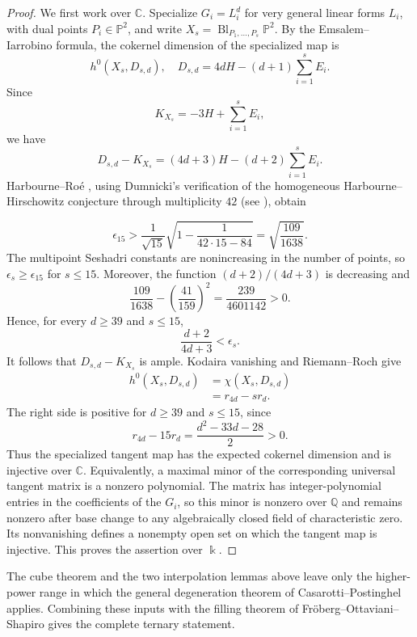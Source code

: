 \documentclass[11pt]{amsart}
\theoremstyle{remark}
\newcommand{\PP}{\mathbb P}
\newcommand{\kk}{\Bbbk}
\begin{document}
\begin{proof}
We first work over $\mathbb C$. Specialize $G_i=L_i^d$ for very general linear forms $L_i$, with dual points $P_i\in\PP^2$, and write $X_s=\operatorname{Bl}_{P_1,\ldots,P_s}\PP^2$. By the Emsalem--Iarrobino formula, the cokernel dimension of the specialized map is
$$
h^0(X_s,D_{s,d}),
\quad
D_{s,d}=4dH-(d+1)\sum_{i=1}^sE_i.
$$
Since
$$
K_{X_s}=-3H+\sum_{i=1}^sE_i,
$$
we have
$$
D_{s,d}-K_{X_s}
=(4d+3)H-(d+2)\sum_{i=1}^sE_i.
$$
Harbourne--Ro\'e \cite[Remark~1.2]{HarbourneRoeSeshadri}, using Dumnicki's verification of the homogeneous Harbourne--Hirschowitz conjecture through multiplicity $42$ (see \cite[Theorem~32]{Dumnicki}), obtain

$$
\epsilon_{15}
>
\frac1{\sqrt{15}}\sqrt{1-\frac1{42\cdot15-84}}
=
\sqrt{\frac{109}{1638}}.
$$
The multipoint Seshadri constants are nonincreasing in the number of points, so $\epsilon_s\ge\epsilon_{15}$ for $s\le15$. Moreover, the function $(d+2)/(4d+3)$ is decreasing and
$$
\frac{109}{1638}-\left(\frac{41}{159}\right)^2
=
\frac{239}{4601142}>0.
$$
Hence, for every $d\ge39$ and $s\le15$,
$$
\frac{d+2}{4d+3}<\epsilon_s.
$$
It follows that $D_{s,d}-K_{X_s}$ is ample. Kodaira vanishing and Riemann--Roch give
$$
\begin{aligned}
h^0(X_s,D_{s,d})
&=\chi(X_s,D_{s,d})\\
&=r_{4d}-sr_d.
\end{aligned}
$$
The right side is positive for $d\ge39$ and $s\le15$, since
$$
r_{4d}-15r_d=\frac{d^2-33d-28}{2}>0.
$$
Thus the specialized tangent map has the expected cokernel dimension and is injective over $\mathbb C$. Equivalently, a maximal minor of the corresponding universal tangent matrix is a nonzero polynomial. The matrix has integer-polynomial entries in the coefficients of the $G_i$, so this minor is nonzero over $\mathbb Q$ and remains nonzero after base change to any algebraically closed field of characteristic zero. Its nonvanishing defines a nonempty open set on which the tangent map is injective. This proves the assertion over $\kk$.
\end{proof}

The cube theorem and the two interpolation lemmas above leave only the higher-power range in which the general degeneration theorem of Casarotti--Postinghel applies. Combining these inputs with the filling theorem of Fr\"oberg--Ottaviani--Shapiro gives the complete ternary statement.
\end{document}
